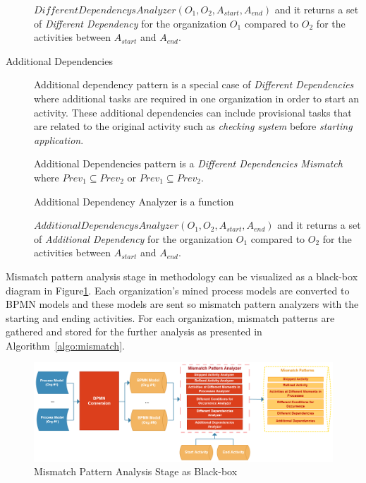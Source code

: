 \begin{description}
\begin{definition}
		$DifferentDependencysAnalyzer(O_{1}, O_{2}, A_{start}, A_{end})$ and it returns a set of \textit{Different Dependency} for the organization $O_{1}$ compared to $O_{2}$ for the activities between $A_{start}$ and $A_{end}$.
		\end{definition}	
	\item[Additional Dependencies] Additional dependency pattern is a special case of \textit{Different Dependencies} where additional tasks are required in one organization in order to start an activity. These additional dependencies can include provisional tasks that are related to the original activity such as \textit{checking system} before \textit{starting application}. 
		\theoremstyle{definition}
		\begin{definition}
		Additional Dependencies pattern is a \textit{Different Dependencies Mismatch} where $Prev_{1} \subseteq Prev_{2}$ or $Prev_{1} \subseteq Prev_{2}$.
		\end{definition}

		\begin{definition}
		Additional Dependency Analyzer is a function 

		$AdditionalDependencysAnalyzer(O_{1}, O_{2}, A_{start}, A_{end})$ and it returns a set of \textit{Additional Dependency} for the organization $O_{1}$ compared to $O_{2}$ for the activities between $A_{start}$ and $A_{end}$.
		\end{definition}	
 \end{description}
 
Mismatch pattern analysis stage in methodology can be visualized as a black-box diagram in Figure\ref{fig:mismatch-pattern-analysis-blackbox}. Each organization's mined process models are converted to BPMN models and these models are sent so mismatch pattern analyzers with the starting and ending activities. For each organization, mismatch patterns are gathered and stored for the further analysis as presented in Algorithm~\ref{algo:mismatch}.
\begin{figure}
  \centering
  \includegraphics[width=\textwidth]{4_methodology/mismatch-pattern-analysis-blackbox}
  \caption{Mismatch Pattern Analysis Stage as Black-box}
  \label{fig:mismatch-pattern-analysis-blackbox}
\end{figure}


